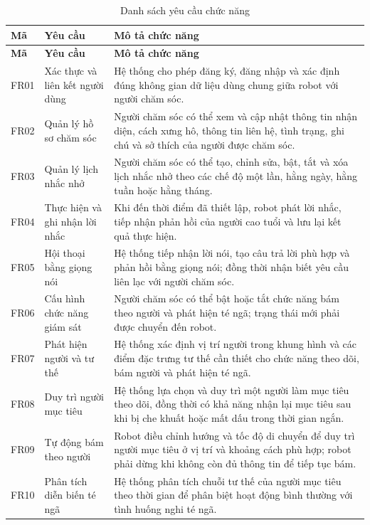 \begin{longtable}{|p{1.2cm}|p{4.0cm}|p{8.1cm}|}
\caption{Danh sách yêu cầu chức năng}\label{tab:functional_requirements}\\
\hline
\textbf{Mã} & \textbf{Yêu cầu} & \textbf{Mô tả chức năng} \\
\hline
\endfirsthead
\hline
\textbf{Mã} & \textbf{Yêu cầu} & \textbf{Mô tả chức năng} \\
\hline
\endhead
FR01 & Xác thực và liên kết người dùng & Hệ thống cho phép đăng ký, đăng nhập và xác định đúng không gian dữ liệu dùng chung giữa robot với người chăm sóc. \\
\hline
FR02 & Quản lý hồ sơ chăm sóc & Người chăm sóc có thể xem và cập nhật thông tin nhận diện, cách xưng hô, thông tin liên hệ, tình trạng, ghi chú và sở thích của người được chăm sóc. \\
\hline
FR03 & Quản lý lịch nhắc nhở & Người chăm sóc có thể tạo, chỉnh sửa, bật, tắt và xóa lịch nhắc nhở theo các chế độ một lần, hằng ngày, hằng tuần hoặc hằng tháng. \\
\hline
FR04 & Thực hiện và ghi nhận lời nhắc & Khi đến thời điểm đã thiết lập, robot phát lời nhắc, tiếp nhận phản hồi của người cao tuổi và lưu lại kết quả thực hiện. \\
\hline
FR05 & Hội thoại bằng giọng nói & Hệ thống tiếp nhận lời nói, tạo câu trả lời phù hợp và phản hồi bằng giọng nói; đồng thời nhận biết yêu cầu liên lạc với người chăm sóc. \\
\hline
FR06 & Cấu hình chức năng giám sát & Người chăm sóc có thể bật hoặc tắt chức năng bám theo người và phát hiện té ngã; trạng thái mới phải được chuyển đến robot. \\
\hline
FR07 & Phát hiện người và tư thế & Hệ thống xác định vị trí người trong khung hình và các điểm đặc trưng tư thế cần thiết cho chức năng theo dõi, bám người và phát hiện té ngã. \\
\hline
FR08 & Duy trì người mục tiêu & Hệ thống lựa chọn và duy trì một người làm mục tiêu theo dõi, đồng thời có khả năng nhận lại mục tiêu sau khi bị che khuất hoặc mất dấu trong thời gian ngắn. \\
\hline
FR09 & Tự động bám theo người & Robot điều chỉnh hướng và tốc độ di chuyển để duy trì người mục tiêu ở vị trí và khoảng cách phù hợp; robot phải dừng khi không còn đủ thông tin để tiếp tục bám. \\
\hline
FR10 & Phân tích diễn biến té ngã & Hệ thống phân tích chuỗi tư thế của người mục tiêu theo thời gian để phân biệt hoạt động bình thường với tình huống nghi té ngã. \\

\end{longtable}
